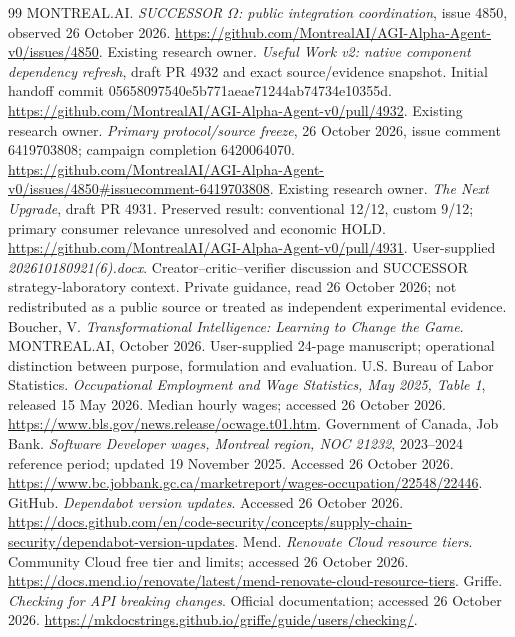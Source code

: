 \documentclass[11pt,letterpaper]{article}
\begin{document}
\begin{thebibliography}{99}\small
{} MONTREAL.AI. \emph{SUCCESSOR $\Omega$: public integration coordination}, issue 4850, observed 26 October 2026. \url{https://github.com/MontrealAI/AGI-Alpha-Agent-v0/issues/4850}.
 Existing research owner. \emph{Useful Work v2: native component dependency refresh}, draft PR 4932 and exact source/evidence snapshot. Initial handoff commit 05658097540e5b771aeae71244ab74734e10355d. \url{https://github.com/MontrealAI/AGI-Alpha-Agent-v0/pull/4932}.
 Existing research owner. \emph{Primary protocol/source freeze}, 26 October 2026, issue comment 6419703808; campaign completion 6420064070. \url{https://github.com/MontrealAI/AGI-Alpha-Agent-v0/issues/4850#issuecomment-6419703808}.
 Existing research owner. \emph{The Next Upgrade}, draft PR 4931. Preserved result: conventional 12/12, custom 9/12; primary consumer relevance unresolved and economic HOLD. \url{https://github.com/MontrealAI/AGI-Alpha-Agent-v0/pull/4931}.
 User-supplied \emph{202610180921(6).docx}. Creator--critic--verifier discussion and SUCCESSOR strategy-laboratory context. Private guidance, read 26 October 2026; not redistributed as a public source or treated as independent experimental evidence.
 Boucher, V. \emph{Transformational Intelligence: Learning to Change the Game}. MONTREAL.AI, October 2026. User-supplied 24-page manuscript; operational distinction between purpose, formulation and evaluation.
 U.S. Bureau of Labor Statistics. \emph{Occupational Employment and Wage Statistics, May 2025, Table 1}, released 15 May 2026. Median hourly wages; accessed 26 October 2026. \url{https://www.bls.gov/news.release/ocwage.t01.htm}.
 Government of Canada, Job Bank. \emph{Software Developer wages, Montreal region, NOC 21232}, 2023--2024 reference period; updated 19 November 2025. Accessed 26 October 2026. \url{https://www.bc.jobbank.gc.ca/marketreport/wages-occupation/22548/22446}.
 GitHub. \emph{Dependabot version updates}. Accessed 26 October 2026. \url{https://docs.github.com/en/code-security/concepts/supply-chain-security/dependabot-version-updates}.
 Mend. \emph{Renovate Cloud resource tiers}. Community Cloud free tier and limits; accessed 26 October 2026. \url{https://docs.mend.io/renovate/latest/mend-renovate-cloud-resource-tiers}.
 Griffe. \emph{Checking for API breaking changes}. Official documentation; accessed 26 October 2026. \url{https://mkdocstrings.github.io/griffe/guide/users/checking/}.

\end{thebibliography}
\end{document}
